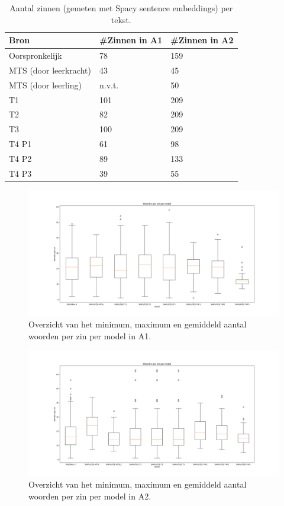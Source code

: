 \begin{table}[h]
	\centering
	\begin{tabular}{ | m{3cm} | m{3cm} | m{3cm} | } 
		\hline
		Bron & #Zinnen in A1 & #Zinnen in A2 \\
		\hline
		Oorspronkelijk & 78  & 159 \\ 
		\hline
		MTS (door leerkracht) & 43 & 45 \\
		\hline
		MTS (door leerling) & n.v.t. & 50 \\
		\hline
		T1 & 101 & 209 \\
		\hline
		T2 & 82 & 209 \\
		\hline
		T3 & 100 & 209 \\
		\hline
		T4 P1 & 61 & 98 \\
		\hline
		T4 P2 & 89 & 133 \\
		\hline
		T4 P3 & 39 & 55 \\
		\hline
	\end{tabular}
	\label{table:resultaten-aantal-zinnen}
	\caption{Aantal zinnen (gemeten met Spacy sentence embeddings) per tekst.}
\end{table}

\begin{figure}
	\includegraphics[width=\linewidth]{img/boxplot-avg-a1.png}
	\caption{Overzicht van het minimum, maximum en gemiddeld aantal woorden per zin per model in A1.}
	\label{img:boxplot-min-max-avg-words-a1}
\end{figure}

\begin{figure}
	\includegraphics[width=\linewidth]{img/boxplot-avg-a2.png}
	\caption{Overzicht van het minimum, maximum en gemiddeld aantal woorden per zin per model in A2.}
	\label{img:boxplot-min-max-avg-words-a2}
\end{figure}

